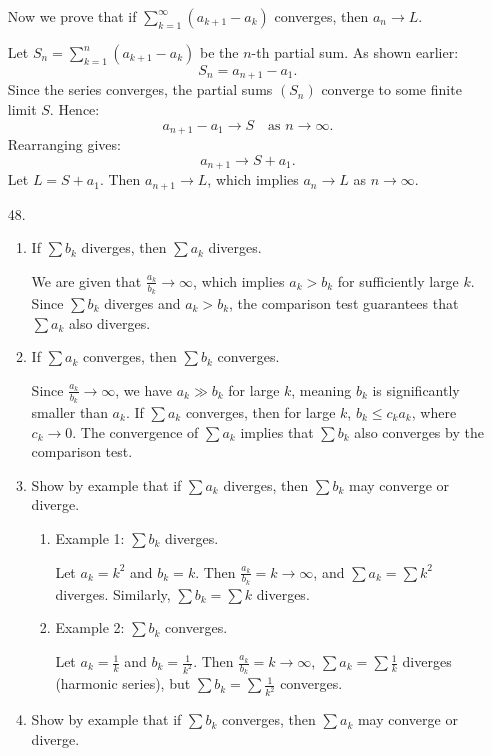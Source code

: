 \documentclass[12pt]{article}
\begin{document}
\begin{enumerate}
Now we prove that if \(\sum_{k=1}^\infty (a_{k+1} - a_k)\) converges, then \(a_n \to L\).

Let \(S_n = \sum_{k=1}^n (a_{k+1} - a_k)\) be the \(n\)-th partial sum. As shown earlier:
\[
S_n = a_{n+1} - a_1.
\]
Since the series converges, the partial sums \((S_n)\) converge to some finite limit \(S\). Hence:
\[
a_{n+1} - a_1 \to S \quad \text{as } n \to \infty.
\]
Rearranging gives:
\[
a_{n+1} \to S + a_1.
\]
Let \(L = S + a_1\). Then \(a_{n+1} \to L\), which implies \(a_n \to L\) as \(n \to \infty\).

\item [48. ]
\begin{enumerate}
    \item If $\sum b_k$ diverges, then $\sum a_k$ diverges.

    We are given that $\frac{a_k}{b_k} \to \infty$, which implies $a_k > b_k$ for sufficiently large $k$. Since $\sum b_k$ diverges and $a_k > b_k$, the comparison test guarantees that $\sum a_k$ also diverges.

    \item If $\sum a_k$ converges, then $\sum b_k$ converges.

    Since $\frac{a_k}{b_k} \to \infty$, we have $a_k \gg b_k$ for large $k$, meaning $b_k$ is significantly smaller than $a_k$. If $\sum a_k$ converges, then for large $k$, $b_k \leq c_k a_k$, where $c_k \to 0$. The convergence of $\sum a_k$ implies that $\sum b_k$ also converges by the comparison test.

    \item Show by example that if $\sum a_k$ diverges, then $\sum b_k$ may converge or diverge.

    \begin{enumerate}
        \item Example 1: $\sum b_k$ diverges.

        Let $a_k = k^2$ and $b_k = k$. Then $\frac{a_k}{b_k} = k \to \infty$, and $\sum a_k = \sum k^2$ diverges. Similarly, $\sum b_k = \sum k$ diverges.

        \item Example 2: $\sum b_k$ converges.

        Let $a_k = \frac{1}{k}$ and $b_k = \frac{1}{k^2}$. Then $\frac{a_k}{b_k} = k \to \infty$, $\sum a_k = \sum \frac{1}{k}$ diverges (harmonic series), but $\sum b_k = \sum \frac{1}{k^2}$ converges.
    \end{enumerate}

    \item Show by example that if $\sum b_k$ converges, then $\sum a_k$ may converge or diverge.


\end{enumerate}
\end{enumerate}
\end{document}
